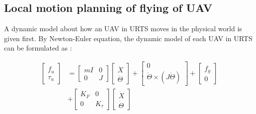 \documentclass{ieeeaccess}
\begin{document}
\subsection{Local motion planning of flying of UAV}
A dynamic model about how an UAV in URTS moves in the physical world is given first. By Newton-Euler equation, the dynamic model of each UAV in URTS can be formulated as \cite{sabatino2015quadrotor}:

\begin{equation} \label{eq:uav} 
    \begin{split}
        \begin{bmatrix}
            f_u \\ \tau_u
        \end{bmatrix}&=\begin{bmatrix}
            mI & 0 \\ 0 & J
        \end{bmatrix}\begin{bmatrix}
            \ddot{X} \\ \ddot{\Theta}
        \end{bmatrix}+\begin{bmatrix}
            0 \\ \dot{\Theta}\times(J\dot{\Theta})
        \end{bmatrix}+\begin{bmatrix}
            f_g \\ 0
        \end{bmatrix}
        \\
        &+\begin{bmatrix}
            K_F & 0 \\
            0 & K_\tau
        \end{bmatrix}\begin{bmatrix}
            \dot{X} \\ \dot{\Theta}
        \end{bmatrix}
    \end{split}
\end{equation}
\end{document}
